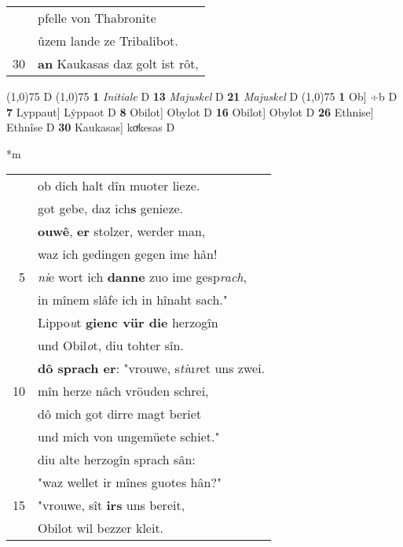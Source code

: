 \documentclass[8pt,a4paper,notitlepage]{article}
\begin{document}
\begin{table}[ht]
\begin{minipage}[t]{0.5\linewidth}
\begin{tabular}{rl}
 & pfelle von Thabronite\\ 
 & ûzem lande ze Tribalibot.\\ 
30 & \textbf{an} Kaukasas daz golt ist rôt,\\ 
\end{tabular}
\scriptsize
\line(1,0){75} \newline
D \newline
\line(1,0){75} \newline
\textbf{1} \textit{Initiale} D  \textbf{13} \textit{Majuskel} D  \textbf{21} \textit{Majuskel} D  \newline
\line(1,0){75} \newline
\textbf{1} Ob] ÷b D \textbf{7} Lyppaut] Lẏppaot D \textbf{8} Obilot] Obylot D \textbf{16} Obilot] Obylot D \textbf{26} Ethnise] Ethnîse D \textbf{30} Kaukasas] koͮkesas D \newline
\end{minipage}
\hspace{0.5cm}
\begin{minipage}[t]{0.5\linewidth}
\small
\begin{center}*m
\end{center}
\begin{tabular}{rl}
 & ob dich halt dîn muoter lieze.\\ 
 & got gebe, daz ich\textbf{s} genieze.\\ 
 & \textbf{ouwê}, \textbf{er} stolzer, werder man,\\ 
 & waz ich gedingen gegen ime hân!\\ 
5 & \textit{ni}e wort ich \textbf{danne} zuo ime gesp\textit{rach},\\ 
 & in mînem slâfe ich in hînaht sach."\\ 
 & Lippo\textit{u}t \textbf{gienc vür die} herzogîn\\ 
 & und Obil\textit{o}t, diu tohter sîn.\\ 
 & \textbf{dô sprach er}: "vrouwe, s\textit{ti}u\textit{r}et uns zwei.\\ 
10 & mîn herze nâch vröuden schrei,\\ 
 & dô mich got dirre magt beriet\\ 
 & und mich von ungemüete schiet."\\ 
 & diu alte herzogîn sprach sân:\\ 
 & "waz wellet ir mînes guotes hân?"\\ 
15 & "vrouwe, sît \textbf{irs} uns bereit,\\ 
 & Obilot wil bezzer kleit.\\ 

\end{tabular}
\end{minipage}
\end{table}
\end{document}
